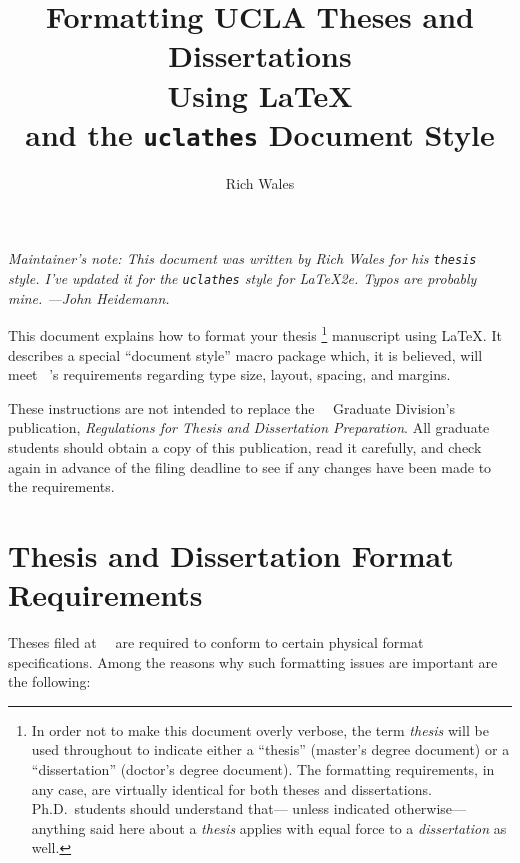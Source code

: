 \documentclass {article}
\title	{ Formatting UCLA Theses and Dissertations \\
	 Using \LaTeX \\
	 and the \texttt{uclathes} Document Style}
\author {Rich Wales}
\date{}
\newcommand {\caps}[1] {\mbox {\ifnum\fam=0 \scshape\else\uppercase\fi{#1}}}
\newcommand {\regs} {{\sl Regulations for Thesis
		      and Dissertation Preparation}}
\newcommand {\ucla} {\caps {ucla}}
\begin{document}
\maketitle

{\slshape  Maintainer's note:
  This document was written by Rich Wales for his \verb|thesis| style.
  I've updated it for the \verb|uclathes| style for \LaTeX 2e.
  Typos are probably mine.
   ---John Heidemann.}


This document explains how to format your thesis%
\footnote {In order not to make this document overly verbose,
the term {\em thesis\/} will be used throughout
to indicate either a ``thesis'' (master's degree document)
or a ``dissertation'' (doctor's degree document).
The formatting requirements, in any case,
are virtually identical for both theses and dissertations.
Ph.D.\ students should understand that---%
unless indicated otherwise---%
anything said here about a {\em thesis\/}
applies with equal force to a {\em dissertation\/} as well.}
manuscript using \LaTeX.
It describes a special ``document style'' macro package
which, it is believed, will meet \ucla's requirements
regarding type size, layout, spacing, and margins.

These instructions are not intended to replace
the \ucla\ Graduate Division's publication, \regs.
All graduate students should obtain a copy of this publication,
read it carefully, and check again in advance
of the filing deadline to see if any changes have been made
to the requirements.


\section {Thesis and Dissertation Format Requirements}

Theses filed at \ucla\ are required to conform
to certain physical format specifications.
Among the reasons why such formatting issues are important
are the following:
\end{document}

